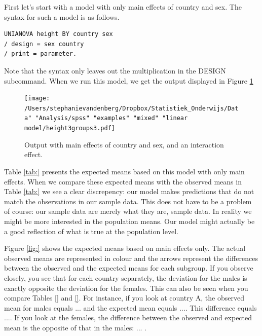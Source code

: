 \documentclass[]{book}\usepackage[]{graphicx}\usepackage[]{color}
\begin{document}
First let's start with a model with only main effects of country and sex. The syntax for such a model is as follows.

\begin{verbatim}
UNIANOVA height BY country sex 
/ design = sex country 
/ print = parameter.
\end{verbatim}

Note that the syntax only leaves out the multiplication in the DESIGN subcommand. When we run this model, we get the output displayed in Figure \ref{fig:interactionheightcountrysexMAIN}

\begin{figure}[h]
    \begin{center}
       \texttt{[image: /Users/stephanievandenberg/Dropbox/Statistiek\_Onderwijs/Data" "Analysis/spss" "examples" "mixed" "linear model/height3groups3.pdf]}
    \end{center}
    \label{fig:interactionheightcountrysexMAIN}
    \caption{Output with main effects of country and sex, and an interaction effect.}
\end{figure}

Table \ref{tab:} presents the expected means based on this model with only main effects. When we compare these expected means with the observed means in Table \ref{tab:} we see a clear discrepency: our model makes predictions that do not match the observations in our sample data. This does not have to be a problem of course: our sample data are merely what they are, sample data. In reality we might be more interested in the population means. Our model might actually be a good reflection of what is true at the population level. 

Figure \ref{fig:} shows the expected means based on main effects only. The actual observed means are represented in colour and the arrows represent the differences between the observed and the expected means for each subgroup. If you observe closely, you see that for each country separately, the deviation for the males is exactly opposite the deviation for the females. This can also be seen when you compare Tables \ref{} and \ref{}. For instance, if you look at country A, the observed mean for males equals ... and the expected mean equals .... This difference equals .... If you look at the females, the difference between the observed and expected mean is the opposite of that in the males: ... .
\end{document}
